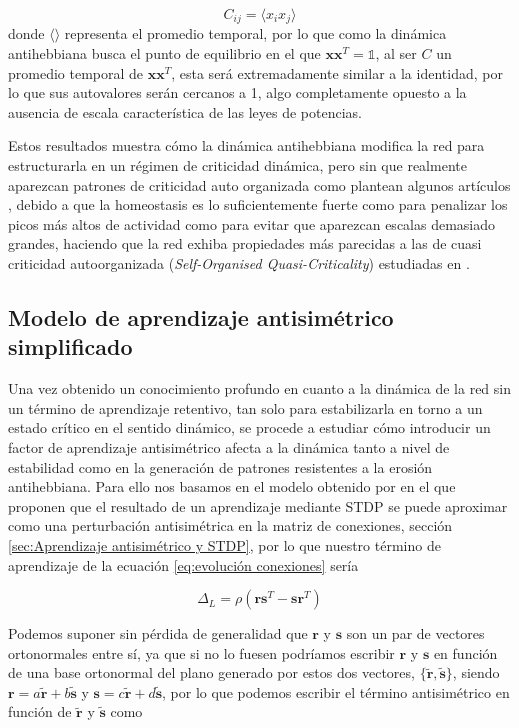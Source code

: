\documentclass[11pt,a4paper,twoside,pdf]{article}
\numberwithin{equation}{section}
\begin{document}
\begin{equation}
  C_{ij} = \langle x_i x_j\rangle
\end{equation}
donde \(\langle \rangle\) representa el promedio temporal, por lo que como la dinámica antihebbiana busca el punto de equilibrio en el que \(\mathbf{xx}^T = \mathbb{1}\), al ser \(C\) un promedio temporal de \(\mathbf{xx}^T\), esta será extremadamente similar a la identidad, por lo que sus autovalores serán cercanos a 1, algo completamente opuesto a la ausencia de escala característica de las leyes de potencias.

Estos resultados muestra cómo la dinámica antihebbiana modifica la red para estructurarla en un régimen de criticidad dinámica, pero sin que realmente aparezcan patrones de criticidad auto organizada como plantean algunos artículos \parencite{magnasco2009}, debido a que la homeostasis es lo suficientemente fuerte como para penalizar los picos más altos de actividad como para evitar que aparezcan escalas demasiado grandes, haciendo que la red exhiba propiedades más parecidas a las de cuasi criticidad autoorganizada (\emph{Self-Organised Quasi-Criticality}) estudiadas en \textcite{buendia2020}.

\subsection{Modelo de aprendizaje antisimétrico simplificado}
Una vez obtenido un conocimiento profundo en cuanto a la dinámica de la red sin un término de aprendizaje retentivo, tan solo para estabilizarla en torno a un estado crítico en el sentido dinámico, se procede a estudiar cómo introducir un factor de aprendizaje antisimétrico afecta a la dinámica tanto a nivel de estabilidad como en la generación de patrones resistentes a la erosión antihebbiana. Para ello nos basamos en el modelo obtenido por \textcite{susman2019} en el que proponen que el resultado de un aprendizaje mediante STDP se puede aproximar como una perturbación antisimétrica en la matriz de conexiones, sección \ref{sec:Aprendizaje antisimétrico y STDP}, por lo que nuestro término de aprendizaje de la ecuación \eqref{eq:evolución conexiones} sería

\begin{equation}
  \Delta_L = \rho (\mathbf{rs}^T - \mathbf{sr}^T)
\end{equation}

Podemos suponer sin pérdida de generalidad que \(\mathbf{r}\) y \(\mathbf{s}\) son un par de vectores ortonormales entre sí, ya que si no lo fuesen podríamos escribir \(\mathbf{r}\) y \(\mathbf{s}\) en función de una base ortonormal del plano generado por estos dos vectores, \(\{\tilde{\mathbf{r}}, \tilde{\mathbf{s}}\}\), siendo \(\mathbf{r} = a\tilde{\mathbf{r}} + b\tilde{\mathbf{s}}\) y \(\mathbf{s} = c\tilde{\mathbf{r}} + d\tilde{\mathbf{s}}\), por lo que podemos escribir el término antisimétrico en función de \(\tilde{\mathbf{r}}\) y \(\tilde{\mathbf{s}}\) como
\end{document}
